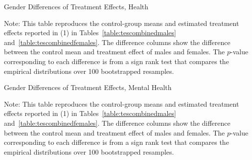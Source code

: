 \begin{table}[!htbp]
\centering
\begin{threeparttable}
\caption{Gender Differences of Treatment Effects, Health}
\begin{scriptsize}

\end{scriptsize}
\begin{tablenotes}
\scriptsize
Note: This table reproduces the control-group means and estimated treatment effects reported in (1) in Tables~\ref{table:tescombinedmales} and~\ref{table:tescombinedfemales}. The difference columns show the difference between the control mean and treatment effect of males and females. The $p$-value corresponding to each difference is from a sign rank test that compares the empirical distributions over 100 bootstrapped resamples.
\end{tablenotes}
\end{threeparttable}
\end{table}

\begin{table}[!htbp]
\centering
\begin{threeparttable}
\caption{Gender Differences of Treatment Effects, Mental Health}
\begin{scriptsize}

\end{scriptsize}
\begin{tablenotes}
\scriptsize
Note: This table reproduces the control-group means and estimated treatment effects reported in (1) in Tables~\ref{table:tescombinedmales} and~\ref{table:tescombinedfemales}. The difference columns show the difference between the control mean and treatment effect of males and females. The $p$-value corresponding to each difference is from a sign rank test that compares the empirical distributions over 100 bootstrapped resamples.
\end{tablenotes}
\end{threeparttable}
\end{table}
